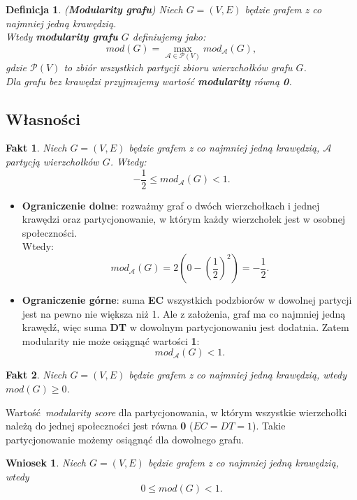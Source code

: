 \documentclass[letterpaper,12pt]{article}
\newtheorem{definition}{Definicja}
\newtheorem{fact}{Fakt}
\newtheorem{conclusion}{Wniosek}
\begin{document}
  \begin{definition}
  (\textbf{Modularity grafu}) Niech \(G = (V, E)\) będzie grafem z co najmniej jedną krawędzią.\\
  Wtedy \textbf{modularity grafu} \(G\) definiujemy jako:
  \[
  mod(G) = \max_{\mathcal{A} \in \mathcal{P}(V)} mod_{\mathcal{A}}(G),
  \]
  gdzie \(\mathcal{P}(V)\) to zbiór wszystkich partycji zbioru wierzchołków grafu \(G\).\\

  Dla grafu bez krawędzi przyjmujemy wartość \textbf{modularity} równą \textbf{0}.
  \end{definition}

\subsection{Własności} \label{własności}
  \begin{fact}
    Niech \(G = (V,E)\) będzie grafem z co najmniej jedną krawędzią, \(\mathcal{A}\) partycją wierzchołków \(G\). Wtedy:
    \[-\frac{1}{2} \leq mod_{\mathcal{A}}(G) < 1.\]
  \end{fact}
  \begin{itemize}
    \item \textbf{Ograniczenie dolne}: rozważmy graf o dwóch wierzchołkach i jednej krawędzi oraz partycjonowanie, w którym każdy wierzchołek jest w osobnej społeczności.\\
    Wtedy:
    \[mod_{\mathcal{A}}(G) = 2\left(0 - \left(\frac{1}{2}\right)^2\right) = - \frac{1}{2}.\]
    \item \textbf{Ograniczenie górne}: suma \textbf{EC} wszystkich podzbiorów w dowolnej partycji jest na pewno nie większa niż 1. Ale z założenia, graf ma co najmniej jedną krawędź, więc suma \textbf{DT} w dowolnym partycjonowaniu jest dodatnia. Zatem modularity nie może osiągnąć wartości \textbf{1}:\\
    \[mod_{\mathcal{A}}(G) < 1.\]
  \end{itemize}

  \begin{fact}
    Niech \(G = (V,E)\) będzie grafem z co najmniej jedną krawędzią, wtedy \(mod(G) \geq 0\).
  \end{fact}
  Wartość \textit{modularity score} dla partycjonowania, w którym wszystkie wierzchołki należą do jednej społeczności jest równa \textbf{0} (\(EC = DT = 1\)). Takie partycjonowanie możemy osiągnąć dla dowolnego grafu.

  \begin{conclusion}
    Niech \(G = (V,E)\) będzie grafem z co najmniej jedną krawędzią, wtedy
    \[0 \leq mod(G) < 1.\]
  \end{conclusion}
\end{document}
